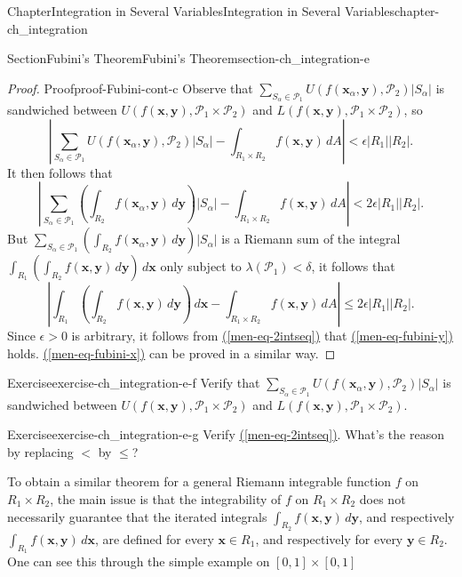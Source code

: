 \documentclass[oneside,10pt,]{book}
\newcommand{\xreffont}{\relax}
\numberwithin{equation}{section}
\newcommand{\bx}{\mathbf{x}}
\newcommand{\by}{\mathbf{y}}
\newcommand{\cP}{\mathcal{P}}
\newcommand{\lt}{<}
\begin{document}
\begin{chapterptx}{Chapter}{Integration in Several Variables}{}{Integration in Several Variables}{}{}{chapter-ch_integration}
\begin{sectionptx}{Section}{Fubini's Theorem}{}{Fubini's Theorem}{}{}{section-ch_integration-e}
\begin{proof}{Proof}{}{proof-Fubini-cont-c}
Observe that \(\sum_{S_{\alpha}\in \cP_1} U(f(\bx_{\alpha}, \by), \cP_{2}) |S_{\alpha}| \) is sandwiched between \(U(f(\bx, \by), \cP_{1}\times \cP_{2})\) and \(L(f(\bx, \by), \cP_{1}\times \cP_{2})\), so%
\begin{equation*}
\left\vert \sum_{S_{\alpha}\in \cP_1} U(f(\bx_{\alpha}, \by), \cP_{2}) |S_{\alpha}|  - 
\int_{R_{1}\times R_{2}} f(\bx, \by)\, dA
\right\vert \lt \epsilon |R_{1}| |R_{2}|.
\end{equation*}
It then follows that%
\begin{equation*}
\left\vert \sum_{S_{\alpha}\in \cP_1} \left(\int_{R_{2}} f(\bx_{\alpha}, \by)\, d\by \right) |S_{\alpha}|-
\int_{R_{1}\times R_{2}} f(\bx, \by)\, dA
\right\vert  \lt 2 \epsilon |R_{1}| |R_{2}|.
\end{equation*}
But \(\sum_{S_{\alpha}\in \cP_1} \left(\int_{R_{2}} f(\bx_{\alpha}, \by)\, d\by \right) |S_{\alpha}|\) is a Riemann sum of the integral \(\int_{R_{1}} \left( \int_{R_{2}} f(\bx, \by)\, d\by \right) \, d\bx\) only subject to \(\lambda (\cP_{1}) \lt \delta\),  it follows that%
\begin{equation}
\left\vert \int_{R_{1}} \left( \int_{R_{2}} f(\bx, \by)\, d\by \right) \, d\bx-
\int_{R_{1}\times R_{2}} f(\bx, \by)\, dA
\right\vert \le  2 \epsilon |R_{1}| |R_{2}|.\label{men-eq-2intseq}
\end{equation}
Since \(\epsilon >0 \) is arbitrary, it follows from \hyperref[men-eq-2intseq]{({\xreffont\ref{men-eq-2intseq}})} that \hyperref[men-eq-fubini-y]{({\xreffont\ref{men-eq-fubini-y}})} holds. \hyperref[men-eq-fubini-x]{({\xreffont\ref{men-eq-fubini-x}})} can be proved in a similar way.\end{proof}
\begin{inlineexercise}{Exercise}{}{exercise-ch_integration-e-f}%
Verify that \(\sum_{S_{\alpha}\in \cP_{1}} U(f(\bx_{\alpha}, \by), \cP_{2}) |S_{\alpha}| \) is sandwiched between \(U(f(\bx, \by), \cP_{1}\times \cP_{2})\) and \(L(f(\bx, \by), \cP_{1}\times \cP_{2})\).%
\end{inlineexercise}%
\begin{inlineexercise}{Exercise}{}{exercise-ch_integration-e-g}%
Verify \hyperref[men-eq-2intseq]{({\xreffont\ref{men-eq-2intseq}})}. What's the reason by replacing \(\lt\) by \(\le\)?%
\end{inlineexercise}%
To obtain a similar theorem for a general Riemann integrable function \(f\) on \(R_{1}\times R_{2}\), the main issue is that the integrability of \(f\) on \(R_{1}\times R_{2}\) does not necessarily guarantee that the iterated integrals \(\int_{R_{2}} f(\bx, \by)\, d\by\), and respectively \(\int_{R_{1}} f(\bx, \by)\, d\bx\), are defined for every \(\bx\in R_{1}\), and respectively for every \(\by\in R_{2}\). One can see this through the simple example on \([0, 1]\times [0, 1]\)%

\end{sectionptx}
\end{chapterptx}
\end{document}
